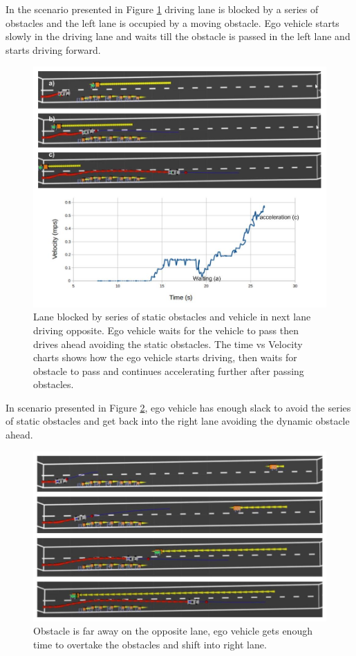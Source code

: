 In the scenario presented in Figure \ref{series_obstacles} driving lane is blocked by a series of obstacles and the left lane is occupied by a moving obstacle. Ego vehicle starts slowly in the driving lane and waits till the obstacle is passed in the left lane and starts driving forward. 
\begin{figure}
    \centering
    \includegraphics[width=1.0\textwidth]{Images/evaluation/vehicle_opp_1.jpg}
    \caption{Lane blocked by series of static obstacles and vehicle in next lane driving opposite. Ego vehicle waits for the vehicle to pass then drives ahead avoiding the static obstacles. The time vs Velocity charts shows how the ego vehicle starts driving, then waits for obstacle to pass and continues accelerating further after passing obstacles.}
    \label{series_obstacles}
\end{figure}

In scenario presented in Figure \ref{series_obstacles_2}, ego vehicle has enough slack to avoid the series of static obstacles and get back into the right lane avoiding the dynamic obstacle ahead. 

\begin{figure}
	\centering
	\includegraphics[width=1.0\textwidth]{Images/evaluation/vehicle_opp_2.jpg}
	\caption{Obstacle is far away on the opposite lane, ego vehicle gets enough time to overtake the obstacles and shift into right lane.}
	\label{series_obstacles_2}
\end{figure}

